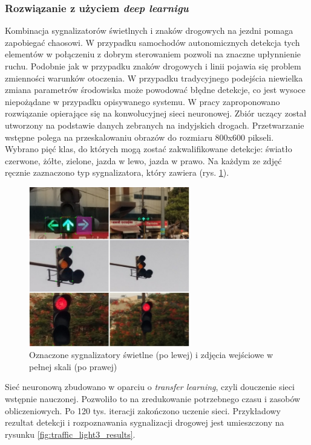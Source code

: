 
\subsubsection{Rozwiązanie z użyciem \textit{deep learnigu}}

Kombinacja sygnalizatorów świetlnych i znaków drogowych na jezdni pomaga zapobiegać chaosowi. 
W przypadku samochodów autonomicznych detekcja tych elementów w połączeniu z dobrym sterowaniem pozwoli na znaczne upłynnienie ruchu.
Podobnie jak w przypadku znaków drogowych i linii pojawia się problem zmienności warunków otoczenia. 
W przypadku tradycyjnego podejścia niewielka zmiana parametrów środowiska może powodować błędne detekcje, co jest wysoce niepożądane w przypadku opisywanego systemu.
W pracy \cite{T10} zaproponowano rozwiązanie opierające się na konwolucyjnej sieci neuronowej.
Zbiór uczący został utworzony na podstawie danych zebranych na indyjskich drogach. 
Przetwarzanie wstępne polega na przeskalowaniu obrazów do rozmiaru 800x600 pikseli. 
Wybrano pięć klas, do których mogą zostać zakwalifikowane detekcje: światło czerwone, żółte, zielone, jazda w lewo, jazda w prawo. 
Na każdym ze zdjęć ręcznie zaznaczono typ sygnalizatora, który zawiera (rys. \ref{fig:traffic_light3_labels}).

\begin{figure}
  \centering
  \includegraphics[width=7cm]{img/traffic_light3_labels.png}
  \caption{Oznaczone sygnalizatory świetlne (po lewej) i zdjęcia wejściowe w pełnej skali (po prawej)\cite{T10}}
  \label{fig:traffic_light3_labels}
\end{figure}

Sieć neuronową zbudowano w oparciu o \textit{transfer learning}, czyli douczenie sieci wstępnie nauczonej. 
Pozwoliło to na zredukowanie potrzebnego czasu i zasobów obliczeniowych. 
Po 120 tys. iteracji zakończono uczenie sieci. 
Przykładowy rezultat detekcji i rozpoznawania sygnalizacji drogowej jest umieszczony na rysunku \ref{fig:traffic_light3_results}.

